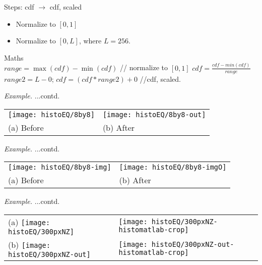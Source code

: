 \documentclass{response}
\begin{document}
{Steps: cdf $\rightarrow$ cdf, scaled \\
\begin{itemize}
\item Normalize to $[0,1]$
\item Normalize to $[0, L]$, where $L = 256$.
\end{itemize}

Maths\\
$range = \max(cdf) - \min(cdf)$ // normalize to $[0,1]$
$cdf = \frac{cdf - min(cdf)}{range}$
\mbox{}\\[5pt]

$ range2 = L - 0$;
$ cdf = (cdf*range2) + 0$ //cdf, scaled. 





\newpage

\bigskip

{\huge \em Example.} ...contd.

\vspace{1cm}

\begin{tabular}{ll}
\texttt{[image: histoEQ/8by8]} &
\texttt{[image: histoEQ/8by8-out]}\\
(a) Before & (b) After
\end{tabular}



\newpage

\bigskip

{\huge \em Example.} ...contd.

\vspace{1cm}

\begin{tabular}{ll}
\texttt{[image: histoEQ/8by8-img]} &
\texttt{[image: histoEQ/8by8-imgO]}\\
(a) Before & (b) After
\end{tabular}




\newpage

\bigskip

{\huge \em Example.} ...contd.

\vspace{1cm}

\begin{tabular}{ll}
(a) \texttt{[image: histoEQ/300pxNZ]} &
\texttt{[image: histoEQ/300pxNZ-histomatlab-crop]} \\
(b) \texttt{[image: histoEQ/300pxNZ-out]}&
\texttt{[image: histoEQ/300pxNZ-out-histomatlab-crop]}
\end{tabular}

}
\end{document}
